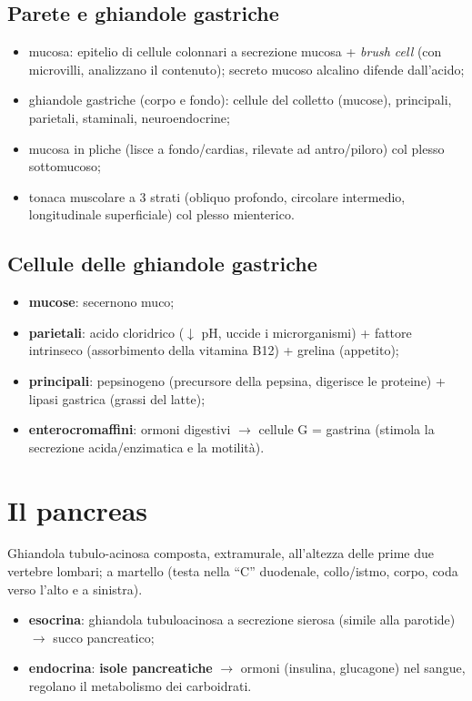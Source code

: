 \subsection{Parete e ghiandole gastriche}
\begin{itemize}
  \item mucosa: epitelio di cellule colonnari a secrezione mucosa + \textit{brush cell} (con
    microvilli, analizzano il contenuto); secreto mucoso alcalino difende dall'acido;
  \item ghiandole gastriche (corpo e fondo): cellule del colletto (mucose), principali, parietali,
    staminali, neuroendocrine;
  \item mucosa in pliche (lisce a fondo/cardias, rilevate ad antro/piloro) col plesso sottomucoso;
  \item tonaca muscolare a 3 strati (obliquo profondo, circolare intermedio, longitudinale
    superficiale) col plesso mienterico.
\end{itemize}

\subsection{Cellule delle ghiandole gastriche}
\begin{itemize}
  \item \textbf{mucose}: secernono muco;
  \item \textbf{parietali}: acido cloridrico ($\downarrow$ pH, uccide i microrganismi) + fattore
    intrinseco (assorbimento della vitamina B12) + grelina (appetito);
  \item \textbf{principali}: pepsinogeno (precursore della pepsina, digerisce le proteine) + lipasi
    gastrica (grassi del latte);
  \item \textbf{enterocromaffini}: ormoni digestivi $\rightarrow$ cellule G = gastrina (stimola la
    secrezione acida/enzimatica e la motilità).
\end{itemize}

\section{Il pancreas}

Ghiandola tubulo-acinosa composta, extramurale, all'altezza delle prime due vertebre lombari; a
martello (testa nella ``C'' duodenale, collo/istmo, corpo, coda verso l'alto e a sinistra).
\begin{itemize}
  \item \textbf{esocrina}: ghiandola tubuloacinosa a secrezione sierosa (simile alla parotide)
    $\rightarrow$ succo pancreatico;
  \item \textbf{endocrina}: \textbf{isole pancreatiche} $\rightarrow$ ormoni (insulina, glucagone)
    nel sangue, regolano il metabolismo dei carboidrati.
\end{itemize}

